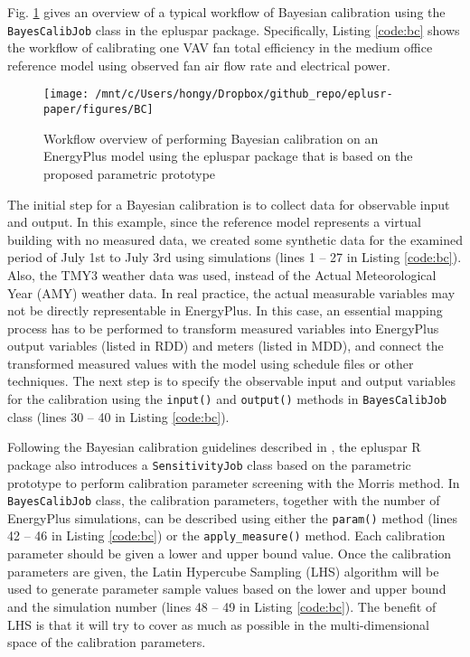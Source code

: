 \documentclass[3p, times]{elsarticle} %
\begin{document}
Fig. \ref{fig:flow-bc} gives an overview of a typical workflow of Bayesian
calibration using the \texttt{BayesCalibJob} class in the epluspar package.
Specifically, Listing \ref{code:bc} shows the workflow of calibrating one VAV
fan total efficiency in the medium office reference model using observed fan
air flow rate and electrical power.

\begin{figure}[!htb]
\texttt{[image: /mnt/c/Users/hongy/Dropbox/github\_repo/eplusr-paper/figures/BC]} \caption{Workflow overview of performing Bayesian calibration on an EnergyPlus model using the epluspar package that is based on the proposed parametric prototype}\label{fig:flow-bc}
\end{figure}

The initial step for a Bayesian calibration is to collect data for observable
input and output.
In this example, since the reference model represents a virtual building with
no measured data, we created some synthetic data for the examined period of July
1st to July 3rd using simulations (lines 1 -- 27 in Listing \ref{code:bc}).
Also, the TMY3 weather data was used, instead of the Actual Meteorological Year
(AMY) weather data.
In real practice, the actual measurable variables may not be directly
representable in EnergyPlus.
In this case, an essential mapping process has to be performed to transform
measured variables into EnergyPlus output variables (listed in RDD) and meters
(listed in MDD), and connect the transformed measured values with the model
using schedule files or other techniques.
The next step is to specify the observable input and output variables for the
calibration using the \texttt{input()} and \texttt{output()} methods in \texttt{BayesCalibJob} class
(lines 30 -- 40 in Listing \ref{code:bc}).

Following the Bayesian calibration guidelines described in \citep{Chong2018},
the epluspar R package also introduces a \texttt{SensitivityJob} class based on the
parametric prototype to perform calibration parameter screening with the Morris
method.
In \texttt{BayesCalibJob} class, the calibration parameters, together with the number
of EnergyPlus simulations, can be described using either the \texttt{param()} method
(lines 42 -- 46 in Listing \ref{code:bc}) or the \texttt{apply\_measure()} method.
Each calibration parameter should be given a lower and upper bound value.
Once the calibration parameters are given, the Latin Hypercube Sampling (LHS)
algorithm will be used to generate parameter sample values based on the lower
and upper bound and the simulation number (lines 48 -- 49 in Listing
\ref{code:bc}).
The benefit of LHS is that it will try to cover as much as possible in the
multi-dimensional space of the calibration parameters.
\end{document}
